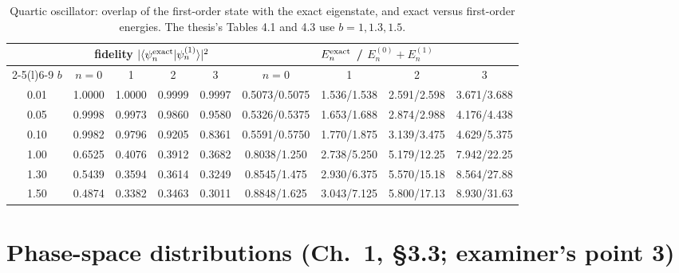 \documentclass[11pt,a4paper]{article}
\begin{document}
\begin{table}[h]
\centering\small
\begin{tabular}{@{}c cccc cccc@{}}
\toprule
& \multicolumn{4}{c}{fidelity $|\langle\psi^{\rm exact}_n|\psi^{(1)}_n\rangle|^2$} & \multicolumn{4}{c}{$E_n^{\rm exact}$ \;/\; $E_n^{(0)}+E_n^{(1)}$}\\
\cmidrule(lr){2-5}\cmidrule(l){6-9}
$b$ & $n=0$ & 1 & 2 & 3 & $n=0$ & 1 & 2 & 3\\
\midrule
0.01 & 1.0000 & 1.0000 & 0.9999 & 0.9997 & 0.5073/0.5075 & 1.536/1.538 & 2.591/2.598 & 3.671/3.688\\
0.05 & 0.9998 & 0.9973 & 0.9860 & 0.9580 & 0.5326/0.5375 & 1.653/1.688 & 2.874/2.988 & 4.176/4.438\\
0.10 & 0.9982 & 0.9796 & 0.9205 & 0.8361 & 0.5591/0.5750 & 1.770/1.875 & 3.139/3.475 & 4.629/5.375\\
1.00 & 0.6525 & 0.4076 & 0.3912 & 0.3682 & 0.8038/1.250 & 2.738/5.250 & 5.179/12.25 & 7.942/22.25\\
1.30 & 0.5439 & 0.3594 & 0.3614 & 0.3249 & 0.8545/1.475 & 2.930/6.375 & 5.570/15.18 & 8.564/27.88\\
1.50 & 0.4874 & 0.3382 & 0.3463 & 0.3011 & 0.8848/1.625 & 3.043/7.125 & 5.800/17.13 & 8.930/31.63\\
\bottomrule
\end{tabular}
\caption{Quartic oscillator: overlap of the first-order state with the exact eigenstate,
and exact versus first-order energies. The thesis's Tables 4.1 and 4.3 use $b=1,1.3,1.5$.}
\label{tab:fid}
\end{table}

\section{Phase-space distributions (Ch.~1, \S3.3; examiner's point 3)}
\label{sec:phase}
\end{document}
